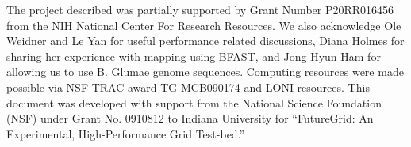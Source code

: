 \documentclass{cpeauth}
\begin{document}
The project described was partially supported by Grant Number
P20RR016456 from the NIH National Center For Research Resources.  We
also acknowledge Ole Weidner and Le Yan for useful performance related
discussions, Diana Holmes for sharing her experience with mapping
using BFAST, and Jong-Hyun Ham for allowing us to use B. Glumae genome
sequences.   Computing
resources were made possible via NSF TRAC award TG-MCB090174 and LONI
resources.  This document was developed with support from the National
Science Foundation (NSF) under Grant No.  0910812 to Indiana
University for ``FutureGrid: An Experimental, High-Performance Grid
Test-bed.''

% 
 

\end{document}
